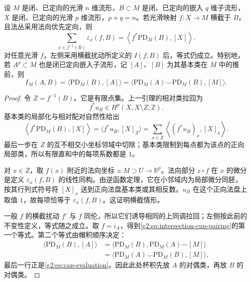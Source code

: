\begin{theorem}\label{g2:thm:geometric-intersection-pairing}
	设 \(M\) 是闭、已定向的光滑 \(n\) 维流形，\(B\subset M\) 是闭、已定向的嵌入 \(q\) 维子流形，\(X\) 是闭、已定向的光滑 \(p\) 维流形，\(p+q=n\)。若光滑映射 \(f:X\to M\) 横截于 \(B\)，且法丛采用法向优先定向，则
	\[
		\sum_{x\in f^{-1}(B)}\varepsilon_x(f,B)
		=\left\langle f^*\mathrm{PD}_M(B),[X]\right\rangle.
	\]
	对任意光滑 \(f\)，左侧采用横截扰动所定义的 \(I(f,B)\) 后，等式仍成立。特别地，若 \(A^p\subset M\) 也是闭已定向嵌入子流形，记 \([A]\)、\([B]\) 为其基本类在 \(M\) 中的推前，则
	\begin{equation}\label{g2:eq:intersection-cup-pairing}
		I_M(A,B)=\langle\mathrm{PD}_M(B),[A]\rangle
		=\langle\mathrm{PD}_M(A)\smile\mathrm{PD}_M(B),[M]\rangle.
	\end{equation}
\end{theorem}
\begin{proof}
	令 \(Z=f^{-1}(B)\)。它是有限点集。上一引理的相对类拉回为
	\[
		f^*u_B\in H^p(X,X\setminus Z;\mathbb Z).
	\]
	基本类的局部化与相对配对自然性给出
	\[
		\left\langle f^*\mathrm{PD}_M(B),[X]\right\rangle
		=\langle f^*u_B,[X]_Z\rangle
		=\sum_{x\in Z}\left\langle(f^*u_B)_x,[X]_x\right\rangle.
	\]
	最后一步在 \(Z\) 的互不相交小坐标邻域中切除；基本类限制到每点都为该点的正向局部类，所以有限直和中的每项系数都是 \(1\)。

	对 \(x\in Z\)，取 \(f(x)\) 附近的法向坐标 \(z:M\supset U\to\mathbb R^p\)。法向部分 \(z\circ f\) 在 \(x\) 的微分是定义 \(\varepsilon_x(f,B)\) 的线性同构。由逆函数定理，它在小邻域内为局部微分同胚，按其行列式符号将 \([X]_x\) 送到正向法盘基本类或其相反数。\(u_B\) 在这个正向法盘上取值 \(1\)，故每项恰等于 \(\varepsilon_x(f,B)\)。这证明横截情形。

	一般 \(f\) 的横截扰动 \(f'\) 与 \(f\) 同伦，所以它们诱导相同的上同调拉回；左侧按此前的不变性定义，等式随之成立。取 \(f=i_A\)，得到\eqref{g2:eq:intersection-cup-pairing}的第一个等式。第二个等式由帽积顺序决定：
	\[
		\begin{aligned}
		\langle\mathrm{PD}_M(B),[A]\rangle
		&=\langle\mathrm{PD}_M(B),\mathrm{PD}_M(A)\frown[M]\rangle\\
		&=\langle\mathrm{PD}_M(A)\smile\mathrm{PD}_M(B),[M]\rangle,
		\end{aligned}
	\]
	最后一行正是\eqref{g2:eq:cap-evaluation}。因此此处杯积先放 \(A\) 的对偶类，再放 \(B\) 的对偶类。
\end{proof}

